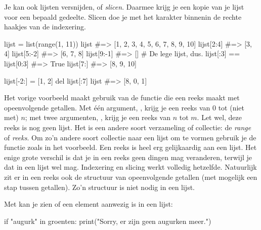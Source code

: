   Je kan ook lijsten versnijden, of \emph{slicen}. Daarmee krijg je een kopie
  van je lijst voor een bepaald gedeelte. Slicen doe je met het karakter \py{:}
  binnenin de rechte haakjes van de indexering.
  \begin{python}
    lijst = list(range(1, 11))
    lijst            #=> [1, 2, 3, 4, 5, 6, 7, 8, 9, 10]
    lijst[2:4]       #=> [3, 4]
    lijst[5:-2]      #=> [6, 7, 8]
    lijst[9:-1]      #=> []  # De lege lijst, dus.
    lijst[:3] == lijst[0:3]  #=> True
    lijst[7:]        #=> [8, 9, 10]

    lijst[-2:] = [1, 2]
    del lijst[:7]
    lijst            #=> [8, 0, 1]
  \end{python}
  Het vorige voorbeeld maakt gebruik van de functie  die een reeks
  maakt met opeenvolgende getallen. Met \'e\'en argument, , krijg
  je een reeks van $0$ tot (niet met) $n$; met twee argumenten, , krijg je een reeks van $n$ tot $m$. Let wel, deze reeks is nog geen
  lijst. Het is een andere soort verzameling of collectie: de \emph{range} of
  \emph{reeks}.
  Om zo'n andere soort collectie naar een lijst om te vormen gebruik je de
  functie  zoals in het voorbeeld. Een reeks is heel erg gelijkaardig
  aan een lijst. Het enige grote verschil is dat je in een reeks geen dingen mag
  veranderen, terwijl je dat in een lijst wel mag. Indexering en slicing werkt
  volledig hetzelfde. Natuurlijk zit er in een reeks ook de structuur van
  opeenvolgende getallen (met mogelijk een stap tussen getallen). Zo'n structuur
  is niet nodig in een lijst.

  Met  kan je zien of een element aanwezig is in een lijst:
  \begin{python}
    if "augurk" in groenten:
      print("Sorry, er zijn geen augurken meer.")
  \end{python}


